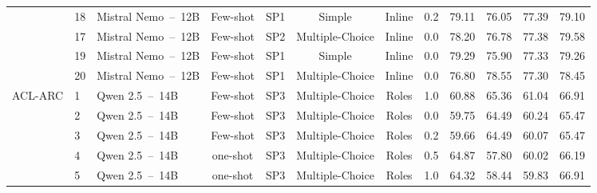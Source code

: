 \begin{table*}[t]
\begin{tabular}{cllccccccccc}
                                    & 18	            & Mistral Nemo~--~12B   & Few-shot      & SP1             & Simple                  & Inline        & 0.2           & 79.11                 & 76.05             & 77.39                 & 79.10                 \\
                                    & 17	            & Mistral Nemo~--~12B   & Few-shot      & SP2             & Multiple-Choice         & Inline        & 0.0           & 78.20                 & 76.78             & 77.38                 & 79.58                 \\
                                    & 19	            & Mistral Nemo~--~12B   & Few-shot      & SP1             & Simple                  & Inline        & 0.0           & 79.29                 & 75.90             & 77.33                 & 79.26                 \\
                                    & 20	            & Mistral Nemo~--~12B   & Few-shot      & SP1             & Multiple-Choice         & Inline        & 0.0           & 76.80                 & 78.55             & 77.30                 & 78.45                 \\
        \hline
        \multirow{20}{*}{ACL-ARC}   & 1                 & Qwen 2.5~--~14B       & Few-shot      & SP3             & Multiple-Choice         & Roles         & 1.0           & 60.88                 & 65.36             & 61.04                 & 66.91                 \\
                                    & 2                 & Qwen 2.5~--~14B       & Few-shot      & SP3             & Multiple-Choice         & Roles         & 0.0           & 59.75                 & 64.49             & 60.24                 & 65.47                 \\
                                    & 3                 & Qwen 2.5~--~14B       & Few-shot      & SP3             & Multiple-Choice         & Roles         & 0.2           & 59.66                 & 64.49             & 60.07                 & 65.47                 \\
                                    & 4                 & Qwen 2.5~--~14B       & one-shot      & SP3             & Multiple-Choice         & Roles         & 0.5           & 64.87                 & 57.80             & 60.02                 & 66.19                 \\
                                    & 5                 & Qwen 2.5~--~14B       & one-shot      & SP3             & Multiple-Choice         & Roles         & 1.0           & 64.32                 & 58.44             & 59.83                 & 66.91                 \\

\end{tabular}
\end{table*}
